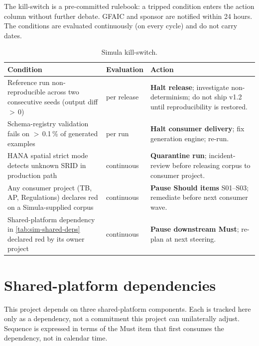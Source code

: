 The kill-switch is a pre-committed rulebook: a tripped condition enters
the action column without further debate. GFAIC and sponsor are
notified within 24 hours. The conditions are evaluated continuously
(on every cycle) and do not carry dates.

\begin{table}[htbp]
\centering
\caption{Simula kill-switch.}
\label{tab:sim-kill-switch}
\footnotesize
\begin{tabularx}{\linewidth}{@{}l l X@{}}
\toprule
\textbf{Condition} & \textbf{Evaluation} & \textbf{Action} \\ \midrule
Reference run non-reproducible across two consecutive seeds (output diff $>$\,0) & per release & \textbf{Halt release}; investigate non-determinism; do not ship v1.2 until reproducibility is restored. \\
Schema-registry validation fails on $>$\,0.1\,\% of generated examples & per run & \textbf{Halt consumer delivery}; fix generation engine; re-run. \\
HANA spatial strict mode detects unknown SRID in production path & continuous & \textbf{Quarantine run}; incident-review before releasing corpus to consumer project. \\
Any consumer project (TB, AP, Regulations) declares red on a Simula-supplied corpus & continuous & \textbf{Pause Should items} S01--S03; remediate before next consumer wave. \\
Shared-platform dependency in \cref{tab:sim-shared-deps} declared red by its owner project & continuous & \textbf{Pause downstream Must}; re-plan at next steering. \\
\bottomrule
\end{tabularx}
\end{table}

\section{Shared-platform dependencies}\label{sec:sim-shared-deps}

This project depends on three shared-platform components. Each is
tracked here only as a dependency, not a commitment this project can
unilaterally adjust. Sequence is expressed in terms of the Must item
that first consumes the dependency, not in calendar time.

